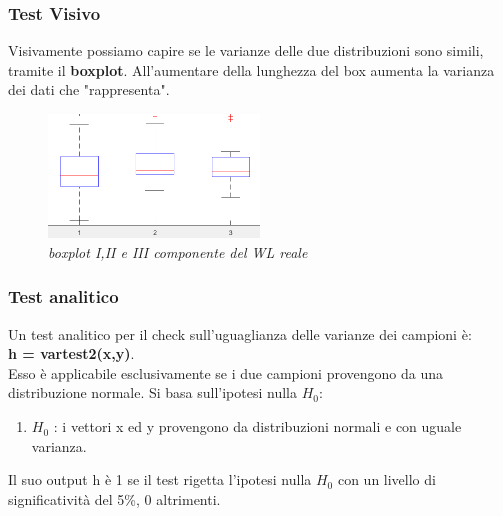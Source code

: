 \subsubsection{Test Visivo}
Visivamente possiamo capire se le varianze delle due distribuzioni sono simili, tramite il \textbf{boxplot}. All'aumentare della lunghezza del box aumenta la varianza dei dati che "rappresenta".
\begin{figure}[H]
	\centering
	\includegraphics[width=0.5\textwidth]{img/hw3/boxplot.png}
	\caption{\textit{boxplot I,II e III componente del WL reale}}
\end{figure}
\subsubsection{Test analitico}
Un test analitico per il check sull'uguaglianza delle varianze dei campioni è: 
\\
\textbf{h = vartest2(x,y)}.
\\
Esso è applicabile esclusivamente se i due campioni provengono da una distribuzione normale.
Si basa sull'ipotesi nulla $H_0$:
\begin{enumerate}
	\item $H_0$ : i vettori x ed y provengono da distribuzioni normali e con uguale varianza. 
\end{enumerate}
Il suo output h è 1 se il test rigetta l'ipotesi nulla $H_0$ con un livello di significatività del 5\%, 0 altrimenti.
